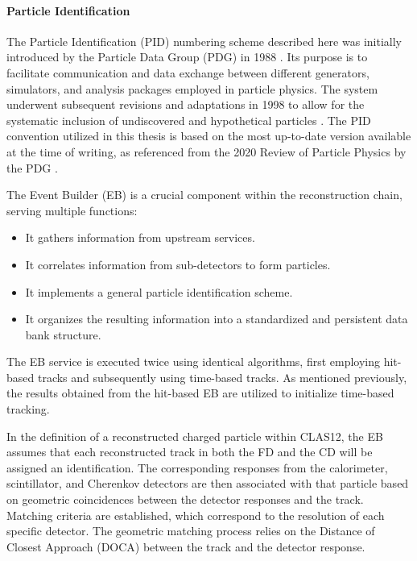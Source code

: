 \paragraph{Particle Identification}
    The Particle Identification (PID) numbering scheme described here was initially introduced by the Particle Data Group (PDG) in 1988 \cite{yost1988}.
    Its purpose is to facilitate communication and data exchange between different generators, simulators, and analysis packages employed in particle physics.
    The system underwent subsequent revisions and adaptations in 1998 to allow for the systematic inclusion of undiscovered and hypothetical particles \cite{particle1998}.
    The PID convention utilized in this thesis is based on the most up-to-date version available at the time of writing, as referenced from the 2020 Review of Particle Physics by the PDG \cite{particle2020review}.

    The Event Builder (EB) is a crucial component within the reconstruction chain, serving multiple functions:
    \begin{itemize}
        \item
            It gathers information from upstream services.
        \item
            It correlates information from sub-detectors to form particles.
        \item
            It implements a general particle identification scheme.
        \item
            It organizes the resulting information into a standardized and persistent data bank structure.
    \end{itemize}

    The EB service is executed twice using identical algorithms, first employing hit-based tracks and subsequently using time-based tracks.
    As mentioned previously, the results obtained from the hit-based EB are utilized to initialize time-based tracking.

    In the definition of a reconstructed charged particle within CLAS12, the EB assumes that each reconstructed track in both the FD and the CD will be assigned an identification.
    The corresponding responses from the calorimeter, scintillator, and Cherenkov detectors are then associated with that particle based on geometric coincidences between the detector responses and the track.
    Matching criteria are established, which correspond to the resolution of each specific detector.
    The geometric matching process relies on the Distance of Closest Approach (DOCA) between the track and the detector response.

